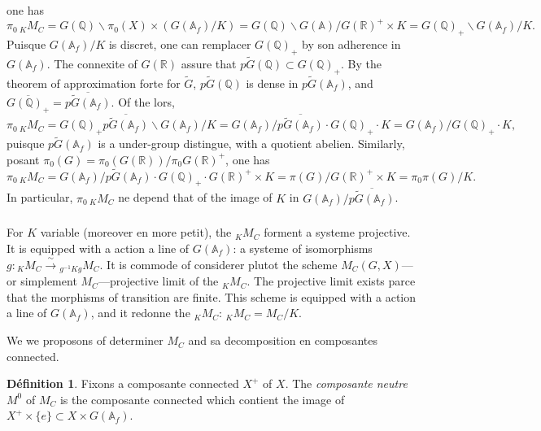 \documentclass[12pt,a4paper]{article}
\theoremstyle{plain}
\theoremstyle{definition}
\newtheorem{definition}[theorem]{D\'efinition}
\theoremstyle{remark}
\newcommand{\QQ}{\mathbb{Q}}
\newcommand{\RR}{\mathbb{R}}
\newcommand{\Af}{\mathbb{A}_f}
\newcommand{\A}{\mathbb{A}}
\begin{document}
one has
\[
\pi_0\, {}_K M_C = G(\QQ)\backslash \pi_0(X) \times (G(\Af)/K) = G(\QQ)\backslash G(\A)/G(\RR)^+ \times K = G(\QQ)_+\backslash G(\Af)/K.
\]
Puisque $G(\Af)/K$ is discret, one can remplacer $G(\QQ)_+$ by son adherence in $G(\Af)$. The connexite of $G(\RR)$ assure that $p\tilde{G}(\QQ) \subset G(\QQ)_+$. By the theorem of approximation forte for $\tilde{G}$, $p\tilde{G}(\QQ)$ is dense in $p\tilde{G}(\Af)$, and $\overline{G(\QQ)_+} = \overline{p\tilde{G}(\Af)}$. Of the lors,
\begin{equation}\label{eq:2.1.3.1}
\pi_0\, {}_K M_C = G(\QQ)_+\overline{p\tilde{G}(\Af)}\backslash G(\Af)/K = G(\Af)/\overline{p\tilde{G}(\Af)} \cdot G(\QQ)_+ \cdot K = G(\Af)/G(\QQ)_+ \cdot K,
\end{equation}
puisque $p\tilde{G}(\Af)$ is a under-group distingue, with a quotient abelien. Similarly, posant $\pi_0(G) = \pi_0(G(\RR))/\pi_0 G(\RR)^+$, one has
\begin{equation}\label{eq:2.1.3.2}
\pi_0\, {}_K M_C = G(\Af)/p\tilde{G}(\Af) \cdot G(\QQ)_+ \cdot G(\RR)^+ \times K = \pi(G)/G(\RR)^+ \times K = \pi_0\pi(G)/K.
\end{equation}
In particular, $\pi_0\, {}_K M_C$ ne depend that of the image of $K$ in $G(\Af)/\overline{p\tilde{G}(\Af)}$.

\subsubsection{}

For $K$ variable (moreover en more petit), the ${}_K M_C$ forment a systeme projective. It is equipped with a action a line of $G(\Af)$: a systeme of isomorphisms $g:{}_K M_C \xrightarrow{\;\sim\;} {}_{g^{-1}Kg} M_C$. It is commode of considerer plutot the scheme $M_C(G,X)$---or simplement $M_C$---projective limit of the ${}_K M_C$. The projective limit exists parce that the morphisms of transition are finite. This scheme is equipped with a action a line of $G(\Af)$, and it redonne the ${}_K M_C$: ${}_K M_C = M_C/K$.

We we proposons of determiner $M_C$ and sa decomposition en composantes connected.

\begin{definition}
Fixons a composante connected $X^+$ of $X$. The \textit{composante neutre} $M^0$ of $M_C$ is the composante connected which contient the image of $X^+ \times \{e\} \subset X \times G(\Af)$.
\end{definition}
\end{document}
